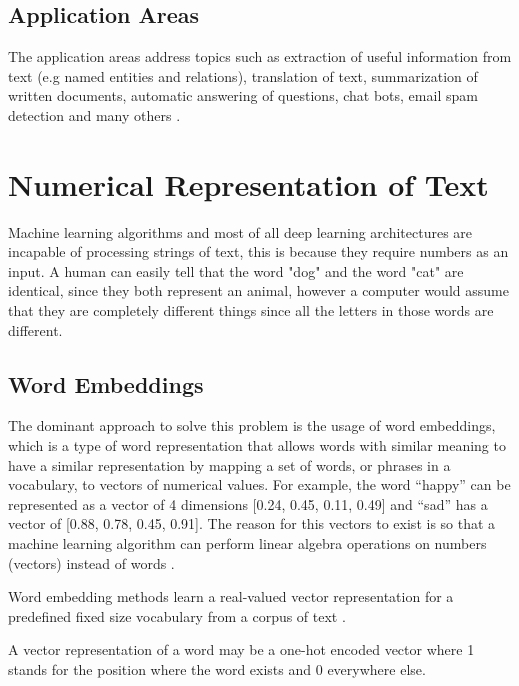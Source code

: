 \subsection{Application Areas}
The application areas address topics such as extraction of useful information from text (e.g named entities and relations), translation of text, summarization of written documents, automatic answering of questions, chat bots, email spam detection and many others \cite{Otter2018}.




\section{Numerical Representation of Text}
\label{sec:num}

\par Machine learning algorithms and most of all deep learning architectures are incapable of processing strings of text, this is because they require numbers as an input. \cite{Vidhya2017} A human can easily tell that the word "dog" and the word "cat" are identical, since they both represent an animal, however a computer would assume that they are completely different things since all the letters in those  words are different. 

    \subsection{Word Embeddings}

    \par The dominant approach to solve this problem is the usage of word embeddings, which is a type of word representation that allows words with similar meaning to have a similar representation by mapping a set of words, or phrases in a vocabulary, to vectors of numerical values. For example, the word “happy” can be represented as a vector of 4 dimensions [0.24, 0.45, 0.11, 0.49] and “sad” has a vector of [0.88, 0.78, 0.45, 0.91]. The reason for this vectors to exist is so that a machine learning algorithm can perform linear algebra operations on numbers (vectors) instead of words \cite{MuratMustafa}.

    \par  Word embedding methods learn a real-valued vector representation for a predefined fixed size vocabulary from a corpus  of text \cite{Brownlee2017}.
   
    \par A vector representation of a word may be a one-hot encoded vector where 1 stands for the position where the word exists and 0 everywhere else. 
    
